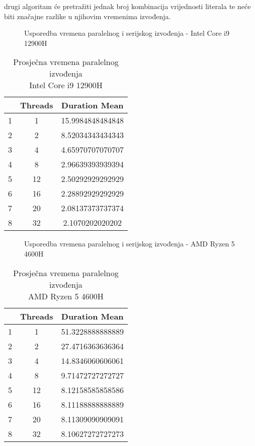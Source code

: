 \documentclass[hidelinks, conference]{IEEEtran}
\begin{document}
drugi algoritam će pretražiti jednak broj kombinacija vrijednosti literala te neće biti značajne razlike u njihovim vremenima izvođenja.


\begin{figure}[ht]
\centerline{}
\caption{Usporedba vremena paralelnog i serijskog izvođenja - Intel Core i9 12900H}
\label{fig1}
\end{figure}

\begin{table}[ht]
\centering
\caption{Prosječna vremena paralelnog izvođenja \\ Intel Core i9 12900H}
\renewcommand{\arraystretch}{1.8}
\begin{tabular}{||c | c | c||} 
 \hline
  & Threads & Duration Mean \\ [0.5ex] 
 \hline \hline
 1&1&15.9984848484848 \\\hline
 2&2&8.52034343434343 \\\hline
 3&4&4.65970707070707 \\\hline
 4&8&2.96639393939394 \\\hline
 5&12&2.50292929292929 \\\hline
 6&16&2.28892929292929 \\\hline
 7&20&2.08137373737374 \\\hline
 8&32&2.1070202020202 \\ \hline
 \hline
\end{tabular}
\label{table:1}
\end{table}

\begin{figure}[ht]
\centerline{}
\caption{Usporedba vremena paralelnog i serijskog izvođenja - AMD Ryzen 5 4600H}
\label{fig2}
\end{figure}


\begin{table}[ht]
\centering
\caption{Prosječna vremena paralelnog izvođenja \\ AMD Ryzen 5 4600H}
\renewcommand{\arraystretch}{1.8}
\begin{tabular}{||c | c | c||} 
 \hline
  & Threads & Duration Mean \\ [0.5ex] 
 \hline \hline
 1&1&51.3228888888889 \\\hline
 2&2&27.4716363636364 \\\hline
 3&4&14.8346060606061 \\\hline
 4&8&9.71472727272727 \\\hline
 5&12&8.12158585858586 \\\hline
 6&16&8.11188888888889 \\\hline
 7&20&8.11309090909091 \\\hline
 8&32&8.10627272727273 \\ \hline
 \hline
\end{tabular}
\label{table:2}
\end{table}
\end{document}
